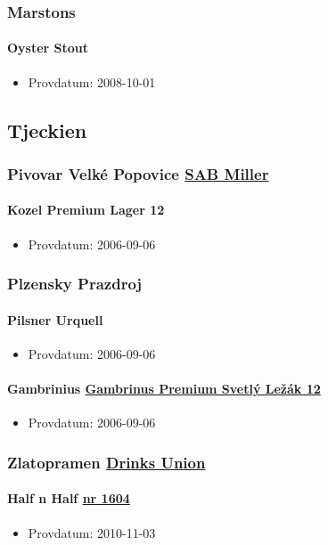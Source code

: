 \documentclass[11pt]{article}
\begin{document}
\subsubsection{Marstons}
\label{sec:org81a402b}
\paragraph{Oyster Stout}
\label{sec:orgaa10eea}
\begin{itemize}
\item Provdatum: 2008-10-01
\end{itemize}
\subsection{Tjeckien}
\label{sec:org995124a}
\subsubsection{Pivovar Velké Popovice \underline{SAB Miller}}
\label{sec:orgb490d9b}
\paragraph{Kozel Premium Lager 12}
\label{sec:org4557eeb}
\begin{itemize}
\item Provdatum: 2006-09-06
\end{itemize}
\subsubsection{Plzensky Prazdroj}
\label{sec:orgb6a6557}
\paragraph{Pilsner Urquell}
\label{sec:orgc67dddb}
\begin{itemize}
\item Provdatum: 2006-09-06
\end{itemize}
\paragraph{Gambrinius \underline{Gambrinus Premium Svetlý Ležák 12}}
\label{sec:org432d30d}
\begin{itemize}
\item Provdatum: 2006-09-06
\end{itemize}
\subsubsection{Zlatopramen \underline{Drinks Union}}
\label{sec:org65df241}
\paragraph{Half n Half \underline{nr 1604}}
\label{sec:org021e6d4}
\begin{itemize}
\item Provdatum: 2010-11-03
\end{itemize}
\end{document}
